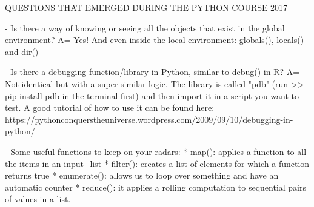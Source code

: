 QUESTIONS THAT EMERGED DURING THE PYTHON COURSE 2017

- Is there a way of knowing or seeing all the objects that exist in the global environment?
A= Yes! And even inside the local environment: globals(), locals() and dir()

- Is there a debugging function/library in Python, similar to debug() in R?
A= Not identical but with a super similar logic. The library is called "pdb" (run >> pip install pdb in the terminal first) and then import it in a script you want to test. A good tutorial of how to use it can be found here: https://pythonconquerstheuniverse.wordpress.com/2009/09/10/debugging-in-python/

- Some useful functions to keep on your radars:
	* map(): applies a function to all the items in an input_list
	* filter(): creates a list of elements for which a function returns true
	* enumerate(): allows us to loop over something and have an automatic counter
	* reduce(): it applies a rolling computation to sequential pairs of values in a list.
